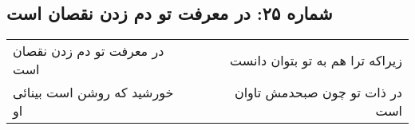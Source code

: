 \begin{center}
\section*{شماره ۲۵: در معرفت تو دم زدن نقصان است}
\label{sec:025}
\begin{longtable}{l p{0.5cm} r}
در معرفت تو دم زدن نقصان است
&&
زیراکه ترا هم به تو بتوان دانست
\\
خورشید که روشن است بینائی او
&&
در ذات تو چون صبحدمش تاوان است
\\
\end{longtable}
\end{center}
